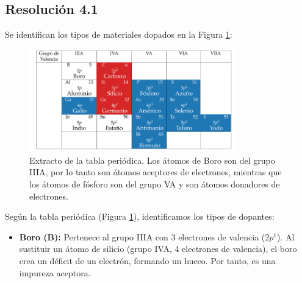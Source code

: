 \documentclass[
  11pt,
  letterpaper,
   addpoints,
   answers
  ]{exam}
\begin{document}
\begin{questions}
\begin{solution}
    \subsection*{Resolución 4.1}
Se identifican los tipos de materiales dopados en la Figura \ref{fig:tabla_periodica}:
    \begin{figure}[H]
        \centering
        \includegraphics[width=0.8\textwidth]{../figures/Auxiliar_2_8.png}
        \caption{Extracto de la tabla periódica. Los átomos de Boro son del grupo IIIA, por lo tanto son átomos aceptores de electrones, mientras que los átomos de fósforo son del grupo VA y son átomos donadores de electrones.}
        \label{fig:tabla_periodica}
    \end{figure}
Según la tabla periódica (Figura \ref{fig:tabla_periodica}), identificamos los tipos de dopantes:
    \begin{itemize}
        \item \textbf{Boro (B):} Pertenece al grupo IIIA con 3 electrones de valencia ($2p^1$). Al sustituir un átomo de silicio (grupo IVA, 4 electrones de valencia), el boro crea un déficit de un electrón, formando un hueco. Por tanto, es una impureza aceptora.
        

\end{itemize}
\end{solution}
\end{questions}
\end{document}
